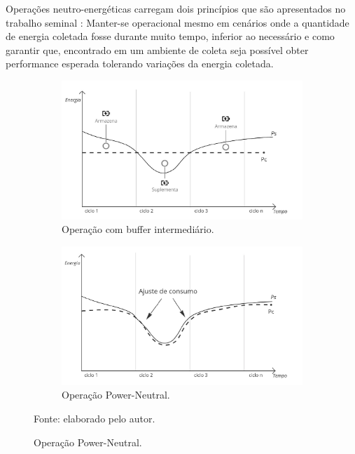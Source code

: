 Operações neutro-energéticas carregam dois princípios que são apresentados no trabalho seminal \cite{kansal_power_2007}: Manter-se operacional mesmo em cenários onde a quantidade de energia coletada fosse durante muito tempo, inferior ao necessário e como garantir que, encontrado em um ambiente de coleta seja possível obter performance esperada tolerando variações da energia coletada. 

\begin{figure}[H]
	\centering
	\caption{Dinâmicas de operação com coleta de energia} \label{fig:dinamicas}
	\begin{subfigure}{0.49\textwidth}
		\caption{Operação com buffer intermediário.}
		\label{fig:cap2energyneutraloperation}
		\includegraphics[width=\linewidth]{Imagens/cap2/cap2energyneutraloperation.jpg}	
	\end{subfigure}%
	\hspace*{\fill}  
	\begin{subfigure}{0.49\textwidth}
		\caption{Operação Power-Neutral.}
		\label{fig:cap2powerneutraloperation}
		\includegraphics[width=\linewidth]{Imagens/cap2/cap2powerneutraloperation.jpg}
	\end{subfigure}%
	\hspace*{\fill}   
	
	Fonte: elaborado pelo autor.
\end{figure}

